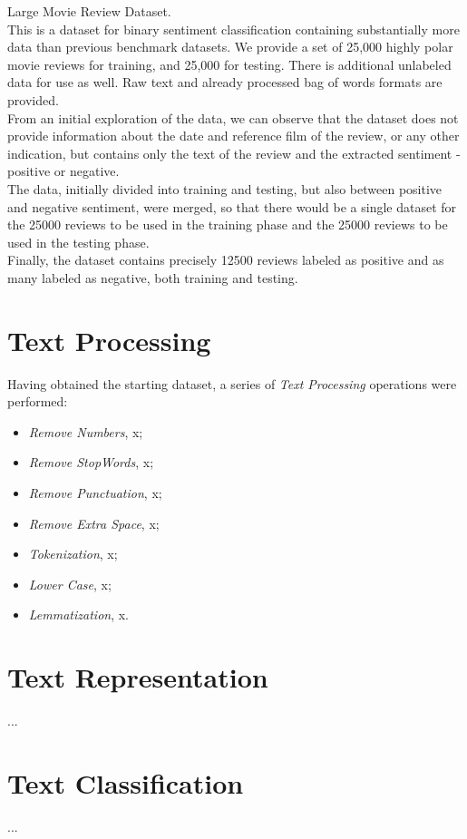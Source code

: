 \documentclass[fleqn,10pt]{SelfArx} %
\begin{document}
Large Movie Review Dataset.\\
This is a dataset for binary sentiment classification containing substantially more data than previous benchmark datasets. We provide a set of 25,000 highly polar movie reviews for training, and 25,000 for testing. There is additional unlabeled data for use as well. Raw text and already processed bag of words formats are provided.\\
From an initial exploration of the data, we can observe that the dataset does not provide information about the date and reference film of the review, or any other indication, but contains only the text of the review and the extracted sentiment - positive or negative.\\
The data, initially divided into training and testing, but also between positive and negative sentiment, were merged, so that there would be a single dataset for the 25000 reviews to be used in the training phase and the 25000 reviews to be used in the testing phase.\\
Finally, the dataset contains precisely 12500 reviews labeled as positive and as many labeled as negative, both training and testing.

\section{Text Processing}
Having obtained the starting dataset, a series of \textit{Text Processing} operations were performed:
\begin{itemize}
	\item \textit{Remove Numbers}, x;
	\item \textit{Remove StopWords}, x;
	\item \textit{Remove Punctuation}, x;
	\item \textit{Remove Extra Space}, x;
	\item \textit{Tokenization}, x;
	\item \textit{Lower Case}, x;
	\item \textit{Lemmatization}, x.
\end{itemize}

\section{Text Representation}
...

\section{Text Classification}
...
\end{document}
